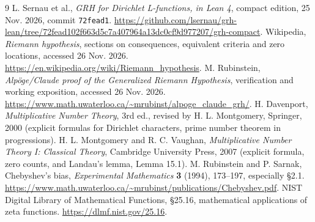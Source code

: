 \documentclass[11pt]{article}
\theoremstyle{definition}\newtheorem{definition}[theorem]{Definition}
\begin{document}
\begin{thebibliography}{9}
 L. Sernau et al., \emph{GRH for Dirichlet L-functions, in Lean 4}, compact edition, 25 Nov. 2026, commit \texttt{72fead1}. \url{https://github.com/lsernau/grh-lean/tree/72fead102f663d5c7a407964a13dc0cf9d977207/grh-compact}.
 Wikipedia, \emph{Riemann hypothesis}, sections on consequences, equivalent criteria and zero locations, accessed 26 Nov. 2026. \url{https://en.wikipedia.org/wiki/Riemann_hypothesis}.
 M. Rubinstein, \emph{Alp\"oge/Claude proof of the Generalized Riemann Hypothesis}, verification and working exposition, accessed 26 Nov. 2026. \url{https://www.math.uwaterloo.ca/~mrubinst/alpoge_claude_grh/}.
 H. Davenport, \emph{Multiplicative Number Theory}, 3rd ed., revised by H. L. Montgomery, Springer, 2000 (explicit formulas for Dirichlet characters, prime number theorem in progressions).
 H. L. Montgomery and R. C. Vaughan, \emph{Multiplicative Number Theory I: Classical Theory}, Cambridge University Press, 2007 (explicit formula, zero counts, and Landau's lemma, Lemma 15.1).
 M. Rubinstein and P. Sarnak, Chebyshev's bias, \emph{Experimental Mathematics} \textbf{3} (1994), 173--197, especially \S2.1. \url{https://www.math.uwaterloo.ca/~mrubinst/publications/Chebyshev.pdf}.
 NIST Digital Library of Mathematical Functions, \S25.16, mathematical applications of zeta functions. \url{https://dlmf.nist.gov/25.16}.
\end{thebibliography}
\end{document}
